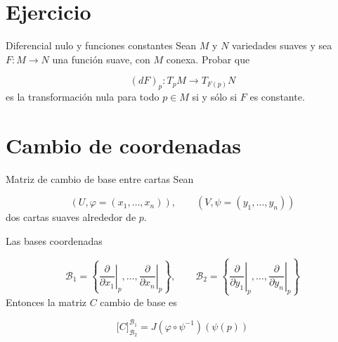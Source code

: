 \section{Ejercicio}
\begin{bookexercise}{Diferencial nulo y funciones constantes}
Sean $M$ y $N$ variedades suaves y sea $F:M\to N$ una función suave, con $M$ conexa. Probar que

\[
(dF)_p:T_pM\to T_{F(p)}N
\]
es la transformación nula para todo $p\in M$ si y sólo si $F$ es constante.

\end{bookexercise}
\section{Cambio de coordenadas}
\begin{bookproposition}{Matriz de cambio de base entre cartas}
Sean

\[
(U,\varphi=(x_1,\dots,x_n)),\qquad (V,\psi=(y_1,\dots,y_n))
\]
dos cartas suaves alrededor de $p$.

Las bases coordenadas

\[
\mathcal B_1=\left\{\left.\frac{\partial}{\partial x_1}\right|_p,\dots,\left.\frac{\partial}{\partial x_n}\right|_p\right\},\qquad\mathcal B_2=\left\{\left.\frac{\partial}{\partial y_1}\right|_p,\dots,\left.\frac{\partial}{\partial y_n}\right|_p\right\}
\]
Entonces la matriz $C$ cambio de base es

\[
\bigl[C\bigr]_{\mathcal B_2}^{\mathcal B_1}=J(\varphi\circ\psi^{-1})(\psi(p))
\]
\end{bookproposition}
